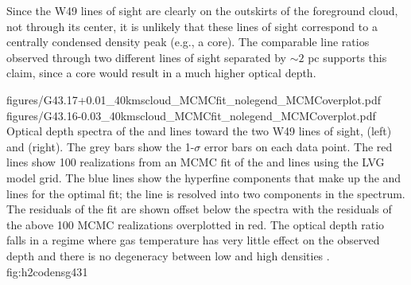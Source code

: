 Since the W49 lines of sight are clearly on the outskirts of the foreground
cloud, not through its center, it is unlikely that these lines of sight
correspond to a centrally condensed density peak (e.g., a core).  The
comparable line ratios observed through two different lines of sight separated
by $\sim 2$ pc supports this claim, since a core would result in a much higher
\twotwo optical depth.


\FigureTwo
          {figures/G43.17+0.01_40kmscloud_MCMCfit_nolegend_MCMCoverplot.pdf}
          {figures/G43.16-0.03_40kmscloud_MCMCfit_nolegend_MCMCoverplot.pdf}
{Optical depth spectra of the \oneone and \twotwo lines toward the two W49
lines of sight, \north (left) and \south (right).   The grey bars show the
1-$\sigma$ error bars on each data point.  The red lines show 100 realizations
from an MCMC fit of the \ortho \oneone and \twotwo lines using the LVG model
grid.  The blue lines show the hyperfine components that make up the \oneone
and \twotwo lines for the optimal fit; the \oneone line is resolved into two
components in the \north spectrum.  The residuals of the fit are shown offset
below the spectra with the residuals of the above 100 MCMC realizations
overplotted in red.  The optical depth ratio falls in a regime where
gas temperature has very little effect on the observed depth and there is no
degeneracy between low and high densities \citep{Ginsburg2011a}.  }
{fig:h2codensg43}{1}

